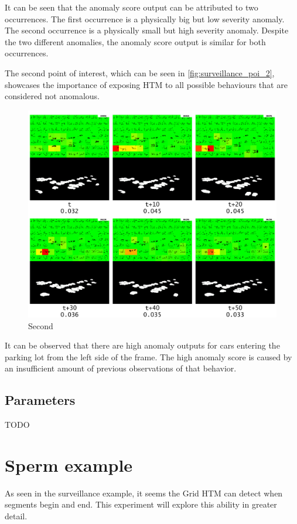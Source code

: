 It can be seen that the anomaly score output can be attributed to two occurrences. The first occurrence is a physically big but low severity anomaly. The second occurrence is a physically small but high severity anomaly. Despite the two different anomalies, the anomaly score output is similar for both occurrences.
\par
The second point of interest, which can be seen in \autoref{fig:surveillance_poi_2}, showcases the importance of exposing HTM to all possible behaviours that are considered not anomalous.
\begin{figure}[H]
    \centering
    \includegraphics[width=\textwidth]{resources/experiments/surveillance/surveillance_poi_2.png}
    \caption{Second}
    \label{fig:surveillance_poi_2}
\end{figure}
It can be observed that there are high anomaly outputs for cars entering the parking lot from the left side of the frame. The high anomaly score is caused by an insufficient amount of previous observations of that behavior.
\subsection{Parameters}
TODO
\clearpage
\section{Sperm example}
As seen in the surveillance example, it seems the Grid HTM can detect when segments begin and end. This experiment will explore this ability in greater detail.
